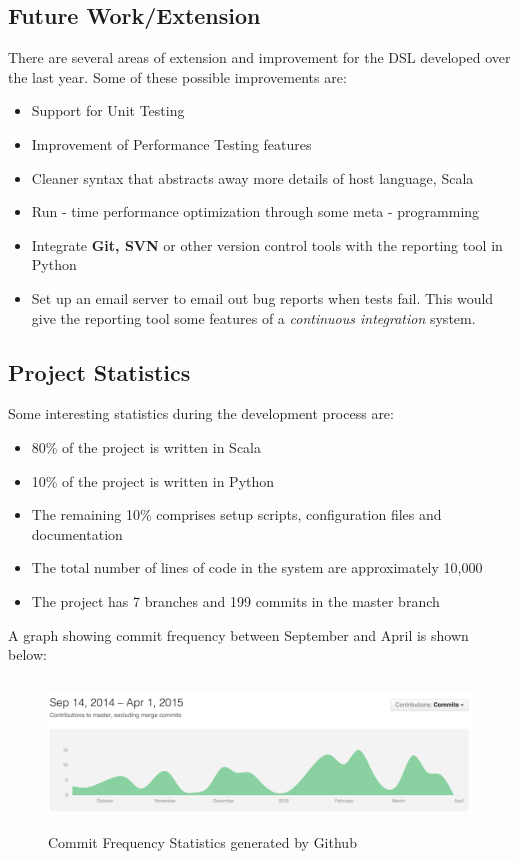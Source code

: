 \documentclass[12pt]{article}
\begin{document}
\subsection{Future Work/Extension}
There are several areas of extension and improvement for the DSL developed over the last year. Some of these possible improvements are:
\begin{itemize}
\item Support for Unit Testing
\item Improvement of Performance Testing features
\item Cleaner syntax that abstracts away more details of host language, Scala
\item Run - time performance optimization through some meta - programming
\item Integrate \textbf{Git, SVN} or other version control tools with the reporting tool in Python
\item Set up an email server to email out bug reports when tests fail. This would give the reporting tool some features of a \textit{continuous integration} system.
\end{itemize}

\subsection{Project Statistics}

Some interesting statistics during the development process are:
\begin{itemize}
\item 80\% of the project is written in Scala
\item 10\% of the project is written in Python
\item The remaining 10\% comprises setup scripts, configuration files and documentation
\item The total number of lines of code in the system are approximately 10,000
\item The project has 7 branches and 199 commits in the master branch
\end{itemize}

A graph showing commit frequency between September and April is shown below:
\begin{figure}[H]
  \centering
    \includegraphics[height=150px]{figures/commit_frequency.png}
  \caption{Commit Frequency Statistics generated by Github}
\end{figure}
\newpage
\end{document}
